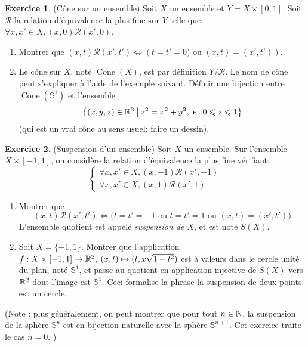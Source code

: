 \documentclass[11pt,a4paper]{article}
\theoremstyle{definition}
\newtheorem{exo}{Exercice}
\newcommand{\exercice}[1]{} \newcommand{\finexercice}{}
\newcommand{\enonce}{\begin{exo}} \newcommand{\finenonce}{\end{exo}}
\newcommand{\noindication}{\stepcounter{ind}}
\newcommand{\nocorrection}{\stepcounter{cor}}
\begin{document}
\noindication

\nocorrection

\finexercice
\exercice{7206, megy, 2019/07/23}

\enonce
(Cône sur un ensemble) 
Soit $X$ un ensemble et $Y = X\times [0,1]$. Soit $\mathcal R$ la relation d'équivalence la plus fine  sur $Y$ telle que $\forall x,x'\in X, (x,0)\mathcal R (x',0)$.
\begin{enumerate}
\item Montrer que $(x,t)\mathcal R (x',t') \iff \left(t=t'=0)\text{ ou } (x,t)=(x',t')\right)$.
\item Le cône sur $X$, noté $\operatorname{Cone}(X)$, est par définition $Y/\mathcal R$. Le nom de \og cône\fg{} peut s'expliquer à l'aide de l'exemple suivant. Définir une bijection entre $\operatorname{Cone}(\mathbb S^1)$ et l'ensemble
\[ \left\{(x,y,z)\in \mathbb{R}^3\:\middle|\: z^2=x^2+y^2, \text{ et } 0\leqslant z \leqslant 1\right\}\]
(qui est un vrai cône au sens usuel: faire un dessin). 
\end{enumerate}
\finenonce

\noindication

\nocorrection

\finexercice
\exercice{7207, megy, 2019/07/23}

\enonce
(Suspension d'un ensemble)
Soit $X$ un ensemble. Sur l'ensemble $X\times [-1,1]$, on considère la relation d'équivalence la plus fine vérifiant:
\[ \begin{cases}
\forall x,x'\in X, (x,-1)\mathcal R (x',-1)\\
\forall x,x'\in X, (x,1)\mathcal R (x',1)
\end{cases}
\] 
\begin{enumerate}
\item Montrer que 
\[ (x,t)\mathcal R (x',t') \iff \big( t=t'=-1 \text{ ou } t=t'=1\text{ ou } (x,t)= (x',t')\big)\] L'ensemble quotient est appelé \emph{suspension de $X$}, et est noté $S(X)$.
\item Soit $X=\{-1,1\}$. Montrer que l'application $f : X\times[-1,1] \to \mathbb{R}^2, \: (x,t) \mapsto (t,x\sqrt{1-t^2})$ est à valeurs dans le cercle unité du plan, noté $\mathbb S^1$, et passe au quotient en application injective de $S(X)$ vers $\mathbb{R}^2$ dont l'image est $\mathbb S^1$. Ceci formalise la phrase \og la suspension de deux points est un cercle.\fg
\end{enumerate}

(Note : plus généralement, on peut montrer que pour tout $n\in\mathbb{N}$, la suspension de la sphère $\mathbb S^n$ est en bijection naturelle avec la sphère $\mathbb S^{n+1}$. Cet exercice traite le cas $n=0$.
)
\finenonce
\end{document}
